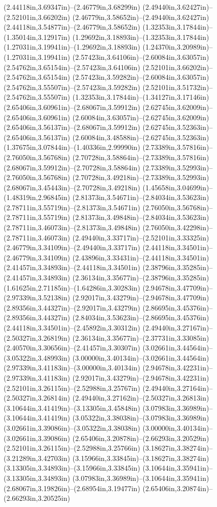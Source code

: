 (2.44118in,3.69347in)--(2.46779in,3.68299in) (2.49440in,3.62427in)--(2.52101in,3.66202in) (2.46779in,3.58652in)--(2.49440in,3.62427in) (2.44118in,3.54877in)--(2.46779in,3.58652in) (1.32353in,3.17844in)--(1.35014in,3.12917in) (1.29692in,3.18893in)--(1.32353in,3.17844in) (1.27031in,3.19941in)--(1.29692in,3.18893in) (1.24370in,3.20989in)--(1.27031in,3.19941in) (2.57423in,3.64106in)--(2.60084in,3.63057in) (2.54762in,3.65154in)--(2.57423in,3.64106in) (2.52101in,3.66202in)--(2.54762in,3.65154in) (2.57423in,3.59282in)--(2.60084in,3.63057in) (2.54762in,3.55507in)--(2.57423in,3.59282in) (2.52101in,3.51732in)--(2.54762in,3.55507in) (1.32353in,3.17844in)--(1.34127in,3.17146in) (2.65406in,3.60961in)--(2.68067in,3.59912in) (2.62745in,3.62009in)--(2.65406in,3.60961in) (2.60084in,3.63057in)--(2.62745in,3.62009in) (2.65406in,3.56137in)--(2.68067in,3.59912in) (2.62745in,3.52363in)--(2.65406in,3.56137in) (2.60084in,3.48588in)--(2.62745in,3.52363in) (1.37675in,3.07844in)--(1.40336in,2.99990in) (2.73389in,3.57816in)--(2.76050in,3.56768in) (2.70728in,3.58864in)--(2.73389in,3.57816in) (2.68067in,3.59912in)--(2.70728in,3.58864in) (2.73389in,3.52993in)--(2.76050in,3.56768in) (2.70728in,3.49218in)--(2.73389in,3.52993in) (2.68067in,3.45443in)--(2.70728in,3.49218in) (1.45658in,3.04699in)--(1.48319in,2.96845in) (2.81373in,3.54671in)--(2.84034in,3.53623in) (2.78711in,3.55719in)--(2.81373in,3.54671in) (2.76050in,3.56768in)--(2.78711in,3.55719in) (2.81373in,3.49848in)--(2.84034in,3.53623in) (2.78711in,3.46073in)--(2.81373in,3.49848in) (2.76050in,3.42298in)--(2.78711in,3.46073in) (2.49440in,3.33717in)--(2.52101in,3.33325in) (2.46779in,3.34109in)--(2.49440in,3.33717in) (2.44118in,3.34501in)--(2.46779in,3.34109in) (2.43896in,3.33431in)--(2.44118in,3.34501in) (2.41457in,3.34893in)--(2.44118in,3.34501in) (2.38796in,3.35285in)--(2.41457in,3.34893in) (2.36134in,3.35677in)--(2.38796in,3.35285in) (1.61625in,2.71185in)--(1.64286in,3.30283in) (2.94678in,3.47709in)--(2.97339in,3.52138in) (2.92017in,3.43279in)--(2.94678in,3.47709in) (2.89356in,3.44327in)--(2.92017in,3.43279in) (2.86695in,3.45376in)--(2.89356in,3.44327in) (2.84034in,3.53623in)--(2.86695in,3.45376in) (2.44118in,3.34501in)--(2.45892in,3.30312in) (2.49440in,3.27167in)--(2.50327in,3.26819in) (2.36134in,3.35677in)--(2.37731in,3.33085in) (2.40570in,3.30656in)--(2.41457in,3.30307in) (3.02661in,3.44564in)--(3.05322in,3.48993in) (3.00000in,3.40134in)--(3.02661in,3.44564in) (2.97339in,3.41183in)--(3.00000in,3.40134in) (2.94678in,3.42231in)--(2.97339in,3.41183in) (2.92017in,3.43279in)--(2.94678in,3.42231in) (2.52101in,3.26115in)--(2.52988in,3.25767in) (2.49440in,3.27164in)--(2.50327in,3.26814in) (2.49440in,3.27162in)--(2.50327in,3.26813in) (3.10644in,3.41419in)--(3.13305in,3.45848in) (3.07983in,3.36989in)--(3.10644in,3.41419in) (3.05322in,3.38038in)--(3.07983in,3.36989in) (3.02661in,3.39086in)--(3.05322in,3.38038in) (3.00000in,3.40134in)--(3.02661in,3.39086in) (2.65406in,3.20878in)--(2.66293in,3.20529in) (2.52101in,3.26115in)--(2.52988in,3.25766in) (3.18627in,3.38274in)--(3.21289in,3.42703in) (3.15966in,3.33845in)--(3.18627in,3.38274in) (3.13305in,3.34893in)--(3.15966in,3.33845in) (3.10644in,3.35941in)--(3.13305in,3.34893in) (3.07983in,3.36989in)--(3.10644in,3.35941in) (2.68067in,3.19826in)--(2.68954in,3.19477in) (2.65406in,3.20874in)--(2.66293in,3.20525in) 